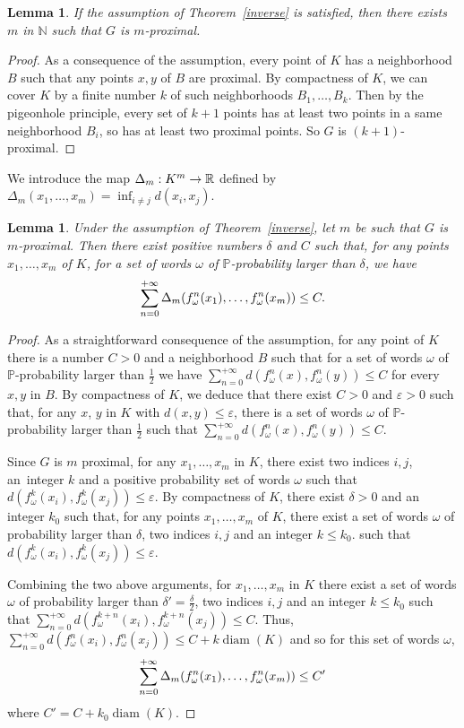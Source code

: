 \documentclass[10pt]{amsart}
\newtheorem{lemm}[theo]{Lemma}\newtheorem{prop}[theo]{Proposition}\newtheorem{coro}[theo]{Corollary}\newtheorem{conj}[theo]{Conjecture}
\theoremstyle{definition}\newtheorem{defi}[theo]{Definition}\newtheorem{rema}[theo]{Remark}\newtheorem{exam}[theo]{Example}\newtheorem{exem}[theo]{Example}\newtheorem{nota}[theo]{Notation}
\DeclareMathOperator{\diam}{diam}
\newcommand{\bbP}{\mathbb{P}}
\newcommand{\R}{\mathbb{R}}
\newcommand{\N}{\mathbb{N}}
\newcommand{\ep}{\varepsilon}
\renewcommand*{\to}{\mathchoice{\longrightarrow}{\rightarrow}{\rightarrow}{\rightarrow}}
\let\originalleft\left
\let\originalright\right
\renewcommand{\left}{\mathopen{}\mathclose\bgroup\originalleft}
\renewcommand{\right}{\aftergroup\egroup\originalright}
\begin{document}
\begin{lemm}
If the assumption of Theorem~\ref{inverse} is satisfied, then there exists $m$ in $\N$ such that $G$ is $m$-proximal.
\end{lemm}

\begin{proof}
As a consequence of the assumption, every point of $K$ has a neighborhood $B$ such that any points $x,y$ of $B$ are proximal. By compactness of $K$, we can cover $K$ by a finite number $k$ of such neighborhoods $B_1,\dots, B_k$. Then by the pigeonhole principle, every set of $k+1$ points has at least two points in a same neighborhood $B_i$, so has at least two proximal points. So $G$ is $(k+1)$-proximal.
\end{proof}

We introduce the map $\Delta_m:K^m\to\R$ defined by $\Delta_m(x_1,\dots,x_m)=\inf_{i\not= j}d(x_i,x_j)$.


\begin{lemm}\label{positiveprobacontraction}
Under the assumption of Theorem~\ref{inverse}, let $m$ be such that $G$ is $m$-proximal. Then there exist positive numbers $\delta$ and $C$ such that, for any points $x_1,\dots,x_m$ of $K$, for a set of words $\omega$ of $\bbP$-probability larger than $\delta$, we have
\[
\sum_{n=0}^{+\infty}\Delta_m\left(f_\omega^n(x_1),\dots,f_\omega^n(x_m)\right)\leq C.
\]
\end{lemm}
\begin{proof}
As a straightforward consequence of the assumption, for any point of $K$ there is a number $C>0$ and a neighborhood $B$ such that for a set of words $\omega$ of $\bbP$-probability larger than $\frac{1}{2}$ we have $\sum_{n=0}^{+\infty}d(f_\omega^n(x),f_\omega^n(y))\leq C$ for every $x,y$ in $B$. By compactness of $K$, we deduce that there exist $C>0$ and $\ep>0$ such that, for any $x$, $y$ in $K$ with $d(x,y)\leq \ep$, there is a set of words $\omega$ of $\bbP$-probability larger than $\frac{1}{2}$ such that $\sum_{n=0}^{+\infty}d(f_\omega^n(x),f_\omega^n(y))\leq C$.

Since $G$ is $m$ proximal, for any $x_1,\dots,x_m$ in $K$, there exist two indices $i, j$, an~integer $k$ and a positive probability set of words $\omega$ such that $d(f_\omega^k(x_i),f_\omega^k(x_j))\leq \ep$. By compactness of $K$, there exist $\delta>0$ and an integer $k_0$ such that, for any points $x_1,\dots,x_m$ of $K$, there exist a set of words $\omega$ of probability larger than $\delta$, two indices $i, j$ and an integer $k \leq k_0$. such that $d(f_\omega^k(x_i),f_\omega^k(x_j))\leq \ep$.


Combining the two above arguments, for $x_1,\dots,x_m$ in $K$ there exist a set of words $\omega$ of probability larger than $\delta'=\frac{\delta}{2}$, two indices $i, j$ and an integer $k \leq k_0$ such that\pagebreak{} $\sum_{n=0}^{+\infty}d(f_\omega^{k+n}(x_i),f_\omega^{k+n}(x_j))\leq C$. Thus, $ \sum_{n=0}^{+\infty}d(f_\omega^{n}(x_i),f_\omega^{n}(x_j))\leq C+ k \diam(K)$ and so for this set of words $\omega$,
\[
\sum_{n=0}^{+\infty}\Delta_m\left(f_\omega^n(x_1),\dots,f_\omega^n(x_m)\right)\leq C'
\]
where $C'=C+ k_0 \diam(K)$.
\end{proof}
\end{document}

